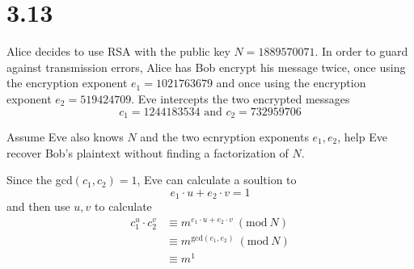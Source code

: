 \documentclass{article}
\newcommand{\Mod}[1]{\ (\mathrm{mod}\ #1)}
\begin{document}
\section*{3.13}
Alice decides to use RSA with the public key \(N = 1889570071\). In order to guard against
transmission errors, Alice has Bob encrypt his message twice, once using the encryption
exponent \(e_1 = 1021763679\) and once using the encryption exponent \(e_2 = 519424709\).
Eve intercepts the two encrypted messages
\begin{equation*}
    c_1 = 1244183534 \text{ and } c_2 = 732959706
\end{equation*}

Assume Eve also knows \(N\) and the two ecnryption exponents \(e_1, e_2\), help Eve recover
Bob's plaintext without finding a factorization of \(N\).

Since the gcd\((c_1, c_2) = 1\), Eve can calculate a soultion to
\begin{equation*}
    e_1 \cdot u + e_2 \cdot v = 1
\end{equation*}
and then use \(u, v\) to calculate
\begin{align*}
    c_1^u \cdot c_2^v & \equiv m^{e_1\cdot u + e_2 \cdot v} \Mod{N} \\
                      & \equiv m^{\text{gcd}(e_1, e_2)} \Mod{N}     \\
                      & \equiv m^1
\end{align*}
\end{document}
